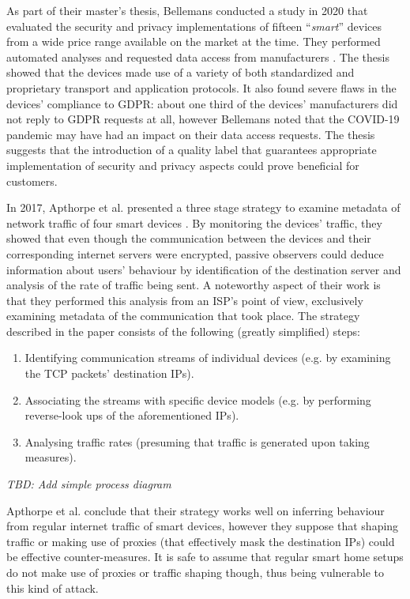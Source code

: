 As part of their master's thesis, Bellemans conducted a study in 2020 that evaluated the security and privacy implementations of fifteen \enquote{\emph{smart}} devices from a wide price range available on the market at the time. They performed automated analyses and requested data access from manufacturers \cite{JonahBellemans}. The thesis showed that the devices made use of a variety of both standardized and proprietary transport and application protocols. It also found severe flaws in the devices' compliance to \ac{GDPR}: about one third of the devices' manufacturers did not reply to \ac{GDPR} requests at all, however Bellemans noted that the COVID-19 pandemic may have had an impact on their data access requests. The thesis suggests that the introduction of a quality label that guarantees appropriate implementation of security and privacy aspects could prove beneficial for customers. \par
In 2017, Apthorpe et al. presented a three stage strategy to examine metadata of network traffic of four smart devices \cite{apthorpe2017smart}.
By monitoring the devices' traffic, they showed that even though the communication between the devices and their corresponding internet servers were encrypted, passive observers could deduce information about users' behaviour by identification of the destination server and analysis of the rate of traffic being sent. A noteworthy aspect of their work is that they performed this analysis from an \ac{ISP}'s point of view, exclusively examining metadata of the communication that took place. The strategy described in the paper consists of the following (greatly simplified) steps:
\begin{enumerate}
    \item Identifying communication streams of individual devices (e.g. by examining the TCP packets' destination IPs).
    \item Associating the streams with specific device models (e.g. by performing reverse-look ups of the aforementioned IPs).
    \item Analysing traffic rates (presuming that traffic is generated upon taking measures).
\end{enumerate}
\emph{TBD: Add simple process diagram}


Apthorpe et al. conclude that their strategy works well on inferring behaviour from regular internet traffic of smart devices, however they suppose that shaping traffic or making use of proxies (that effectively mask the destination IPs) could be effective counter-measures. It is safe to assume that regular smart home setups do not make use of proxies or traffic shaping though, thus being vulnerable to this kind of attack. \par

